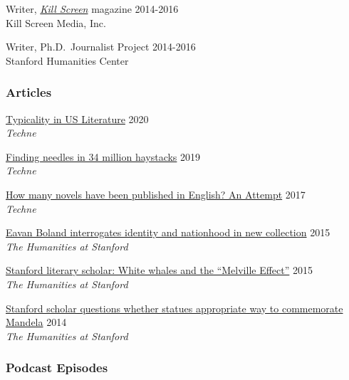 \documentclass[
  12pt,
  letterpaper,
]{article}
\begin{document}
Writer, \href{https://web.archive.org/web/20221003115514/https://killscreen.com/previously/author/erik-fredner/}{\emph{Kill Screen}} magazine \hfill 2014-2016\\
Kill Screen Media, Inc.

Writer, Ph.D.~Journalist Project \hfill 2014-2016\\
Stanford Humanities Center

\hypertarget{articles}{%
\subsubsection{Articles}\label{articles}}

\href{https://web.archive.org/web/20220430165427/https://litlab.stanford.edu/typicality-in-the-u-s-novel/}{Typicality
in US Literature} \hfill 2020\\
\emph{Techne}

\href{https://web.archive.org/web/20220430054802/https://litlab.stanford.edu/finding-needles-in-34-million-haystacks/}{Finding
needles in 34 million haystacks} \hfill 2019\\
\emph{Techne}

\href{https://web.archive.org/web/20220323072937/https://litlab.stanford.edu/how-many-novels-have-been-published-in-english-an-attempt/}{How
many novels have been published in English? An Attempt} \hfill 2017\\
\emph{Techne}

\href{https://web.archive.org/web/20210810123746/https://news.stanford.edu/news/2015/february/boland-country-book-022615.html}{Eavan
Boland interrogates identity and nationhood in new collection}
\hfill 2015\\
\emph{The Humanities at Stanford}

\href{https://web.archive.org/web/20210810125202/https://news.stanford.edu/news/2015/may/melville-scholar-boone-051115.html}{Stanford
literary scholar: White whales and the ``Melville Effect''}
\hfill 2015\\
\emph{The Humanities at Stanford}

\href{https://web.archive.org/web/20220611230152/https://news.stanford.edu/pr/2014/pr-mandela-statue-parker-120314.html}{Stanford
scholar questions whether statues appropriate way to commemorate
Mandela} \hfill 2014\\
\emph{The Humanities at Stanford}

\hypertarget{podcast-episodes}{%
\subsubsection{Podcast Episodes}\label{podcast-episodes}}
\end{document}
